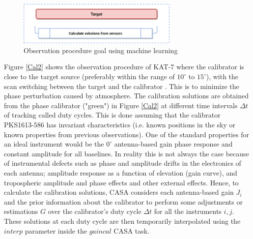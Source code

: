 \begin{figure}[H]
  \centering
    \includegraphics[width=0.7\textwidth]{images/Cal3.png}
    \caption{Observation procedure goal using machine learning}
  \label{Cal3}
\end{figure}

Figure \ref{Cal2} shows the observation procedure of KAT-7 where the calibrator is close to the target source (preferably within the range of $10^{\circ}$ to $15^{\circ}$), with the scan switching  between  the target and the calibrator \citep{taylor1999synthesis}. This is to minimize the phase perturbation caused by atmosphere. The calibration solutions are obtained from the phase calibrator ("green") in Figure \ref{Cal2} at different time intervals $\Delta t$ of tracking called duty cycles. This is done assuming that the calibrator PKS1613-586 has invariant characteristics (i.e. known positions in the sky or known properties from previous observations). One of the standard properties for an ideal instrument would be the $0^{\circ}$ antenna-based gain phase response and constant amplitude for all baselines. In reality this is not always the case because of instrumental defects such as phase and amplitude drifts in the electronics of each antenna; amplitude response as a function of elevation (gain curve), and tropospheric amplitude and phase effects and other external effects. Hence, to calculate the calibration solutions, CASA considers each antenna-based gain $J_i$ and the prior information about the calibrator to perform some adjustments or estimations $G$ over the calibrator's duty cycle $\Delta t$ for all the instruments $i,j$. These solutions at each duty cycle are then temporarily interpolated using the $\textit{interp}$ parameter inside the $\textit{gaincal}$ CASA task. 

